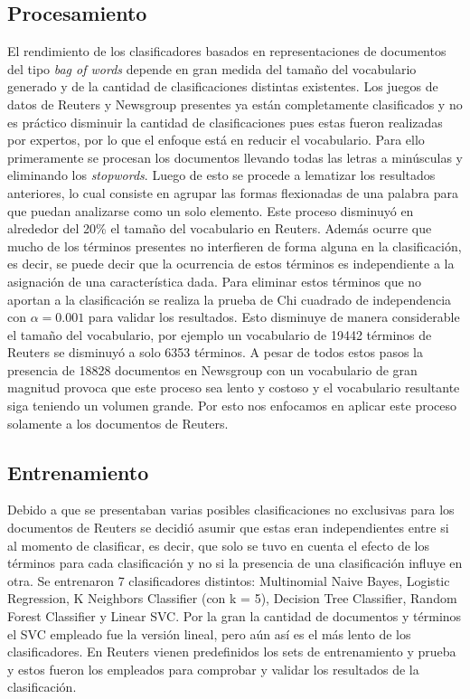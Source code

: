 \documentclass[12pt]{llncs}
\begin{document}
\subsection {Procesamiento}
\par El rendimiento de los clasificadores basados en representaciones de documentos del tipo \emph{bag of words} depende en gran medida del tamaño del vocabulario generado y de la cantidad de clasificaciones distintas existentes. Los juegos de datos de Reuters y Newsgroup presentes ya están completamente clasificados y no es práctico disminuir la cantidad de clasificaciones pues estas fueron realizadas por expertos, por lo que el enfoque está en reducir el vocabulario. Para ello primeramente se procesan los documentos llevando todas las letras a minúsculas y eliminando los \emph{stopwords}. Luego de esto se procede a lematizar los resultados anteriores, lo cual consiste en agrupar las formas flexionadas de una palabra para que puedan analizarse como un solo elemento. Este proceso disminuyó en alrededor del 20\% el tamaño del vocabulario en Reuters. Además ocurre que mucho de los términos presentes no interfieren de forma alguna en la clasificación, es decir, se puede decir que la ocurrencia de estos términos es independiente a la asignación de una característica dada. Para eliminar estos términos que no aportan a la clasificación se realiza la prueba de Chi cuadrado de independencia con $\alpha = 0.001$ para validar los resultados. Esto disminuye de manera considerable el tamaño del vocabulario, por ejemplo un vocabulario de 19442 términos de Reuters se disminuyó a solo 6353 términos. A pesar de todos estos pasos la presencia de 18828 documentos en Newsgroup con un vocabulario de gran magnitud provoca que este proceso sea lento y costoso y el vocabulario resultante siga teniendo un volumen grande. Por esto nos enfocamos en aplicar este proceso solamente a los documentos de Reuters.

\subsection {Entrenamiento}

Debido a que se presentaban varias posibles clasificaciones no exclusivas para los documentos de Reuters se decidió asumir que estas eran independientes entre si al momento de clasificar, es decir, que solo se tuvo en cuenta el efecto de los términos para cada clasificación y no si la presencia de una clasificación influye en otra. Se entrenaron 7 clasificadores distintos: Multinomial Naive Bayes, Logistic Regression, K Neighbors Classifier (con k = 5), Decision Tree Classifier, Random Forest Classifier y Linear SVC. Por la gran la cantidad de documentos y términos el SVC empleado fue la versión lineal, pero aún así es el más lento de los clasificadores. En Reuters vienen predefinidos los sets de entrenamiento y prueba y estos fueron los empleados para comprobar y validar los resultados de la clasificación. 
\end{document}
